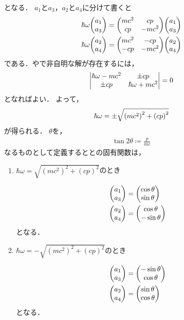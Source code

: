 \documentclass{report}
\begin{document}
    となる．
    $a_1$と$a_3$，$a_2$と$a_4$に分けて書くと
    \begin{align}
      \hbar \omega
      \mqty(a_1 \\ a_3)
      &=
      \mqty(
        mc^2 & cp\\
        cp & -mc^2
      )
      \mqty(a_1 \\ a_3)\label{up-spin} \\ 
      \hbar \omega
      \mqty(a_2 \\ a_4)
        &=
        \mqty(
          mc^2 & -cp\\
          -cp & -mc^2
        )
        \mqty(a_2 \\ a_4)\label{down-spin}
    \end{align}
    である．やで非自明な解が存在するには，
    \begin{align}
      \mdet{
        \hbar \omega - mc^2 & \pm cp\\
        \pm cp & \hbar\omega + mc^2
      }
      = 0
    \end{align}
    となればよい．
    よって，
    \begin{align}
      \hbar \omega = \pm \sqrt{\qty(mc^2)^2 + \qty(cp)^2}
    \end{align}
    が得られる．
    $\theta$を，
    \begin{align}
      \tan 2\theta \coloneqq \frac{p}{mc}
    \end{align}
    なるものとして定義するととの固有関数は，
    \begin{enumerate}
      \item $\hbar\omega = \sqrt{(mc^2)^2 + (cp)^2}$のとき \par
        \begin{align}
          \mqty(a_1 \\ a_3) &= \mqty(\cos\theta \\ \sin\theta) \\ 
          \mqty(a_2 \\ a_4) &= \mqty(\cos\theta \\ -\sin\theta)
        \end{align}
        となる．
      \item $\hbar\omega = -\sqrt{(mc^2)^2 + (cp)^2}$のとき \par
        \begin{align}
          \mqty(a_1 \\ a_3) &= \mqty(-\sin\theta \\ \cos\theta) \\ 
          \mqty(a_2 \\ a_4) &= \mqty(\sin\theta \\ \cos\theta)
        \end{align}
        となる．
    \end{enumerate}
\end{document}
